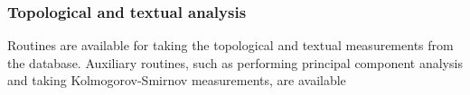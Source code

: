 																																																																																																																																																																																																																																																																																																																																																																																																																																																								\subsubsection{Topological and textual analysis}\label{ana}
																																																																																																																																																																																																																																																																																																																																																																																																																																																								Routines are available for taking the topological and textual measurements from
																																																																																																																																																																																																																																																																																																																																																																																																																																																								the database.
																																																																																																																																																																																																																																																																																																																																																																																																																																																								Auxiliary routines, such as performing principal component analysis
																																																																																																																																																																																																																																																																																																																																																																																																																																																								and taking Kolmogorov-Smirnov measurements, are available
